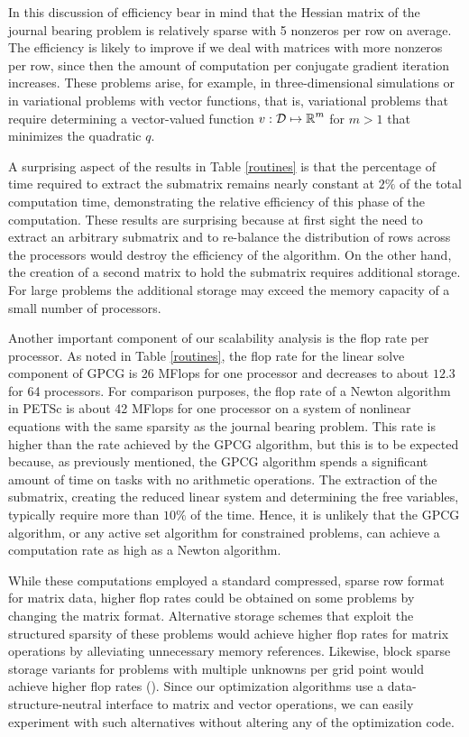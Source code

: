 \documentclass{esub2acm}
\newcommand{\R}{\mbox{${\mathbb R}$}}
\newcommand{\cD} {\mbox{$\cal D$}}
\begin{document}
In this discussion of efficiency bear in mind
that the Hessian matrix of the journal bearing problem is relatively
sparse with 5 nonzeros per row on average. 
The efficiency is likely to improve if we deal with
matrices with more nonzeros per row,
since then the amount of computation per conjugate gradient iteration 
increases.
These problems arise, for example,
in three-dimensional simulations or in variational
problems with vector functions, that is, variational
problems that require determining a vector-valued
function
$ v : \cD \mapsto \R^m $ for $ m > 1 $ that minimizes the quadratic $q$.


A surprising aspect of the results in Table \ref{routines} is that
the percentage of time
required to extract the submatrix remains nearly constant
at $2\%$ of the total computation time, demonstrating the relative 
efficiency of this phase of the computation.
These results are surprising because at first sight the need to
extract an arbitrary submatrix and to re-balance the distribution of
rows across the processors would destroy the efficiency of the algorithm.
On the other hand, the creation of a second matrix to 
hold the submatrix requires
additional storage.  For large problems the additional storage
may exceed the memory capacity of a small number of processors.

Another important component of our scalability analysis is
the flop rate per processor.
As noted in Table \ref{routines}, the flop rate for the
linear solve component of GPCG is 26 MFlops for
one processor and decreases to about $ 12.3 $ for 64 processors.
For comparison purposes, the flop rate of a Newton algorithm in
PETSc is about 42 MFlops for one processor on a system of nonlinear
equations with the same sparsity as the journal bearing problem.
This rate is higher than the rate achieved by the GPCG algorithm,
but this is to be expected because,  as previously mentioned, 
the GPCG algorithm spends a significant amount of time on tasks
with no arithmetic operations.  The extraction of the submatrix,
creating the reduced linear system and determining the
free variables, typically require more than $ 10\% $ of the time.
Hence, it is unlikely that the GPCG algorithm, or any 
active set algorithm for constrained problems, can
achieve a computation rate as high as a Newton algorithm.

While these computations employed a standard 
compressed, sparse row format for matrix data,
higher flop rates could be obtained on
some problems by changing the matrix format.
Alternative storage
schemes that exploit the structured sparsity of these problems would
achieve higher flop rates for matrix operations by alleviating
unnecessary memory references.  Likewise, block sparse storage
variants for problems with multiple unknowns per grid point would
achieve higher flop rates ().  Since our optimization
algorithms use a data-structure-neutral interface to matrix and vector
operations, we can easily experiment with such alternatives without
altering any of the optimization code.
\end{document}

